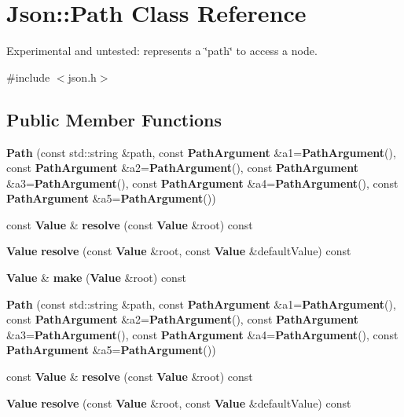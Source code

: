 \section{Json\+:\+:Path Class Reference}
\label{class_json_1_1_path}


Experimental and untested\+: represents a \char`\"{}path\char`\"{} to access a node.  




{\ttfamily \#include $<$json.\+h$>$}

\subsection*{Public Member Functions}
\begin{DoxyCompactItemize}
\item 
{\bfseries Path} (const std\+::string \&path, const {\bf Path\+Argument} \&a1={\bf Path\+Argument}(), const {\bf Path\+Argument} \&a2={\bf Path\+Argument}(), const {\bf Path\+Argument} \&a3={\bf Path\+Argument}(), const {\bf Path\+Argument} \&a4={\bf Path\+Argument}(), const {\bf Path\+Argument} \&a5={\bf Path\+Argument}())\label{class_json_1_1_path_aaa37a99650e770d0cd680bf53585ec99}

\item 
const {\bf Value} \& {\bfseries resolve} (const {\bf Value} \&root) const \label{class_json_1_1_path_ae1d05fa985a6ee3c57f2b8ed186b5982}

\item 
{\bf Value} {\bfseries resolve} (const {\bf Value} \&root, const {\bf Value} \&default\+Value) const \label{class_json_1_1_path_a33d1749770a4cf74e9a3de419bc7febe}

\item 
{\bf Value} \& {\bf make} ({\bf Value} \&root) const 
\item 
{\bfseries Path} (const std\+::string \&path, const {\bf Path\+Argument} \&a1={\bf Path\+Argument}(), const {\bf Path\+Argument} \&a2={\bf Path\+Argument}(), const {\bf Path\+Argument} \&a3={\bf Path\+Argument}(), const {\bf Path\+Argument} \&a4={\bf Path\+Argument}(), const {\bf Path\+Argument} \&a5={\bf Path\+Argument}())\label{class_json_1_1_path_aaa37a99650e770d0cd680bf53585ec99}

\item 
const {\bf Value} \& {\bfseries resolve} (const {\bf Value} \&root) const \label{class_json_1_1_path_a781d60b27fdb34f228018e5b1ce16d59}

\item 
{\bf Value} {\bfseries resolve} (const {\bf Value} \&root, const {\bf Value} \&default\+Value) const \label{class_json_1_1_path_a33d1749770a4cf74e9a3de419bc7febe}


\end{DoxyCompactItemize}
